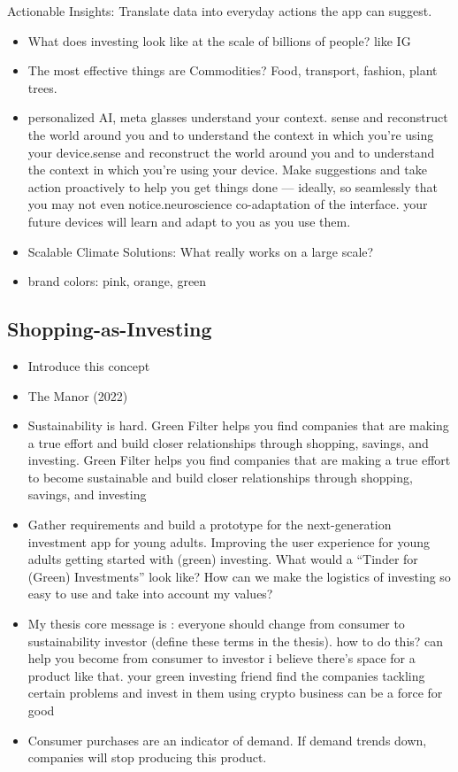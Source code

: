 \documentclass[
  letterpaper,
  DIV=11,
  numbers=noendperiod]{scrartcl}
\providecommand{\tightlist}{%
  \setlength{\itemsep}{0pt}\setlength{\parskip}{0pt}}\usepackage{longtable,booktabs,array}
\begin{document}
Actionable Insights: Translate data into everyday actions the app can
suggest.

\begin{itemize}
\tightlist
\item
  What does investing look like at the scale of billions of people? like
  IG
\item
  The most effective things are Commodities? Food, transport, fashion,
  plant trees.
\item
  personalized AI, meta glasses understand your context. sense and
  reconstruct the world around you and to understand the context in
  which you're using your device.sense and reconstruct the world around
  you and to understand the context in which you're using your device.
  Make suggestions and take action proactively to help you get things
  done --- ideally, so seamlessly that you may not even
  notice.neuroscience co-adaptation of the interface. your future
  devices will learn and adapt to you as you use them.
\item
  Scalable Climate Solutions: What really works on a large scale?
\item
  brand colors: pink, orange, green
\end{itemize}

\subsection{Shopping-as-Investing}\label{shopping-as-investing}

\begin{itemize}
\item
  Introduce this concept
\item
  The Manor (2022)
\item
  Sustainability is hard. Green Filter helps you find companies that are
  making a true effort and build closer relationships through shopping,
  savings, and investing. Green Filter helps you find companies that are
  making a true effort to become sustainable and build closer
  relationships through shopping, savings, and investing
\item
  Gather requirements and build a prototype for the next-generation
  investment app for young adults. Improving the user experience for
  young adults getting started with (green) investing. What would a
  ``Tinder for (Green) Investments'' look like? How can we make the
  logistics of investing so easy to use and take into account my values?
\item
  My thesis core message is : everyone should change from consumer to
  sustainability investor (define these terms in the thesis). how to do
  this? can help you become from consumer to investor i believe there's
  space for a product like that. your green investing friend find the
  companies tackling certain problems and invest in them using crypto
  business can be a force for good
\item
  Consumer purchases are an indicator of demand. If demand trends down,
  companies will stop producing this product.
\end{itemize}
\end{document}
